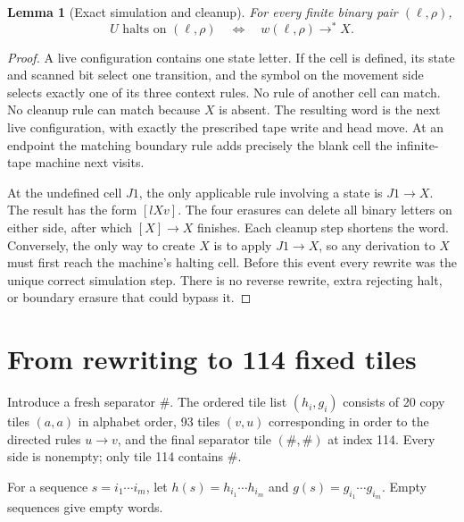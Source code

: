 \documentclass[11pt,letterpaper]{article}
\newtheorem{lemma}[theorem]{Lemma}
\theoremstyle{definition}
\theoremstyle{remark}
\newcommand{\hto}{\mathrel{\longrightarrow}}
\newcommand{\st}{\mathrel{\longrightarrow^{*}}}
\begin{document}
\begin{lemma}[Exact simulation and cleanup]\label{gts:um:lem:rewrite}
For every finite binary pair $(\ell,\rho)$,
\[
 U\text{ halts on }(\ell,\rho)\quad\Longleftrightarrow\quad
 w(\ell,\rho)\st X.
\]
\end{lemma}
\begin{proof}
A live configuration contains one state letter. If the cell is defined, its state and scanned bit select one transition, and the symbol on the movement side selects exactly one of its three context rules. No rule of another cell can match. No cleanup rule can match because $X$ is absent. The resulting word is the next live configuration, with exactly the prescribed tape write and head move. At an endpoint the matching boundary rule adds precisely the blank cell the infinite-tape machine next visits.

At the undefined cell $J1$, the only applicable rule involving a state is $J1\hto X$. The result has the form $[lXv]$. The four erasures can delete all binary letters on either side, after which $[X]\hto X$ finishes. Each cleanup step shortens the word. Conversely, the only way to create $X$ is to apply $J1\hto X$, so any derivation to $X$ must first reach the machine's halting cell. Before this event every rewrite was the unique correct simulation step. There is no reverse rewrite, extra rejecting halt, or boundary erasure that could bypass it.
\end{proof}

\section{From rewriting to 114 fixed tiles}
\label{gts:um:sec:tiles}
Introduce a fresh separator $\#$. The ordered tile list $(h_i,g_i)$ consists of 20 copy tiles $(a,a)$ in alphabet order, 93 tiles $(v,u)$ corresponding in order to the directed rules $u\hto v$, and the final separator tile $(\#,\#)$ at index 114. Every side is nonempty; only tile 114 contains $\#$.

For a sequence $s=i_1\cdots i_m$, let $h(s)=h_{i_1}\cdots h_{i_m}$ and $g(s)=g_{i_1}\cdots g_{i_m}$. Empty sequences give empty words.
\end{document}
